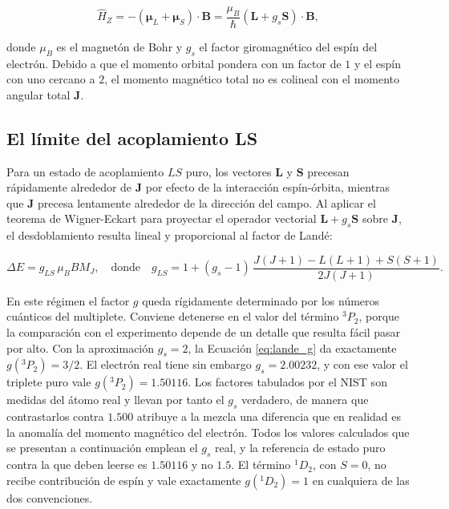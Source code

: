 \begin{equation}
    \hat{H}_Z = - (\boldsymbol{\mu}_L + \boldsymbol{\mu}_S) \cdot \mathbf{B} = \frac{\mu_B}{\hbar} (\mathbf{L} + g_s \mathbf{S}) \cdot \mathbf{B},
\end{equation}

donde $\mu_B$ es el magnetón de Bohr y $g_s$ el factor giromagnético del espín del electrón. Debido a que el momento orbital pondera con un factor de $1$ y el espín con uno cercano a $2$, el momento magnético total no es colineal con el momento angular total $\mathbf{J}$.

\subsection{El límite del acoplamiento LS}

Para un estado de acoplamiento $LS$ puro, los vectores $\mathbf{L}$ y $\mathbf{S}$ precesan rápidamente alrededor de $\mathbf{J}$ por efecto de la interacción espín-órbita, mientras que $\mathbf{J}$ precesa lentamente alrededor de la dirección del campo. Al aplicar el teorema de Wigner-Eckart para proyectar el operador vectorial $\mathbf{L} + g_s\mathbf{S}$ sobre $\mathbf{J}$, el desdoblamiento resulta lineal y proporcional al factor de Landé:

\begin{equation}
    \label{eq:lande_g}
    \Delta E = g_{LS}\, \mu_B B M_J, \quad \text{donde} \quad g_{LS} = 1 + (g_s - 1)\,\frac{J(J+1) - L(L+1) + S(S+1)}{2J(J+1)}.
\end{equation}

En este régimen el factor $g$ queda rígidamente determinado por los números cuánticos del multiplete. Conviene detenerse en el valor del término $^3P_2$, porque la comparación con el experimento depende de un detalle que resulta fácil pasar por alto. Con la aproximación $g_s = 2$, la Ecuación \eqref{eq:lande_g} da exactamente $g(^3P_2) = 3/2$. El electrón real tiene sin embargo $g_s = 2.00232$, y con ese valor el triplete puro vale $g(^3P_2) = 1.50116$. Los factores tabulados por el NIST son medidas del átomo real y llevan por tanto el $g_s$ verdadero, de manera que contrastarlos contra $1.500$ atribuye a la mezcla una diferencia que en realidad es la anomalía del momento magnético del electrón. Todos los valores calculados que se presentan a continuación emplean el $g_s$ real, y la referencia de estado puro contra la que deben leerse es $1.50116$ y no $1.5$. El término $^1D_2$, con $S=0$, no recibe contribución de espín y vale exactamente $g(^1D_2) = 1$ en cualquiera de las dos convenciones.

